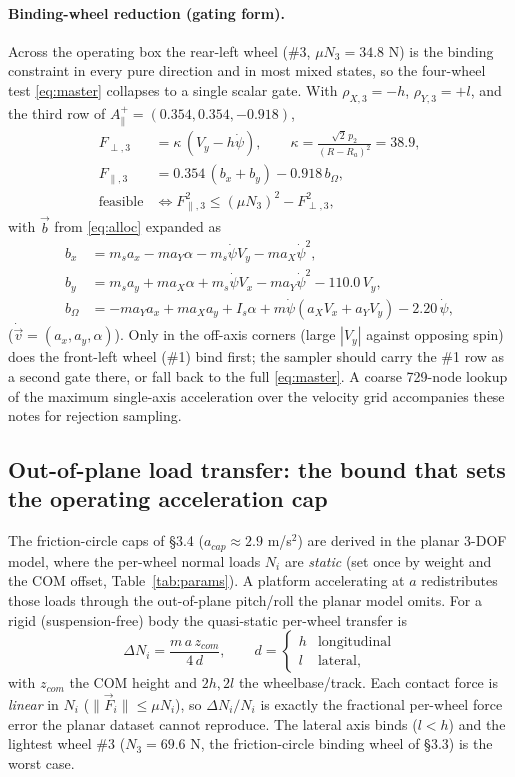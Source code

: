 \documentclass[11pt]{article}
\begin{document}
\paragraph{Binding-wheel reduction (gating form).} Across the operating box the rear-left wheel
(\#3, $\mu N_3=34.8$ N) is the binding constraint in every pure direction and in most mixed states,
so the four-wheel test \eqref{eq:master} collapses to a single scalar gate. With
$\rho_{X,3}=-h$, $\rho_{Y,3}=+l$, and the third row of $A_\parallel^{+}=(0.354,0.354,-0.918)$,
\begin{align}
F_{\perp,3}&=\kappa\,(V_y-h\dot\psi),\qquad \kappa=\frac{\sqrt2\,p_2}{(R-R_a)^2}=38.9,\\
F_{\parallel,3}&=0.354\,(b_x+b_y)-0.918\,b_\Omega,\\
\text{feasible}&\iff F_{\parallel,3}^2\le(\mu N_3)^2-F_{\perp,3}^2,
\end{align}
with $\vec b$ from \eqref{eq:alloc} expanded as
\begin{align}
b_x&=m_s a_x-ma_Y\alpha-m_s\dot\psi V_y-ma_X\dot\psi^2,\\
b_y&=m_s a_y+ma_X\alpha+m_s\dot\psi V_x-ma_Y\dot\psi^2-110.0\,V_y,\\
b_\Omega&=-ma_Y a_x+ma_X a_y+I_s\alpha+m\dot\psi(a_XV_x+a_YV_y)-2.20\,\dot\psi,
\end{align}
($\dot{\vec v}=(a_x,a_y,\alpha)$). Only in the off-axis corners (large $|V_y|$ against opposing
spin) does the front-left wheel (\#1) bind first; the sampler should carry the \#1 row as a second
gate there, or fall back to the full \eqref{eq:master}. A coarse 729-node lookup of the maximum
single-axis acceleration over the velocity grid accompanies these notes for rejection sampling.

\subsection{Out-of-plane load transfer: the bound that sets the operating
acceleration cap}
The friction-circle caps of \S3.4 ($a_{cap}\approx2.9$ m/s$^2$) are derived in the
planar 3-DOF model, where the per-wheel normal loads $N_i$ are \emph{static} (set
once by weight and the COM offset, Table~\ref{tab:params}). A platform
accelerating at $a$ redistributes those loads through the out-of-plane pitch/roll
the planar model omits. For a rigid (suspension-free) body the quasi-static
per-wheel transfer is
\begin{equation}
\Delta N_i=\frac{m\,a\,z_{com}}{4\,d},\qquad
d=\begin{cases}h&\text{longitudinal}\\ l&\text{lateral,}\end{cases}
\label{eq:loadtransfer}
\end{equation}
with $z_{com}$ the COM height and $2h,2l$ the wheelbase/track. Each contact force
is \emph{linear} in $N_i$ ($\|\vec F_i\|\le\mu N_i$), so $\Delta N_i/N_i$ is
exactly the fractional per-wheel force error the planar dataset cannot reproduce.
The lateral axis binds ($l<h$) and the lightest wheel \#3 ($N_3=69.6$ N, the
friction-circle binding wheel of \S3.3) is the worst case.
\end{document}
